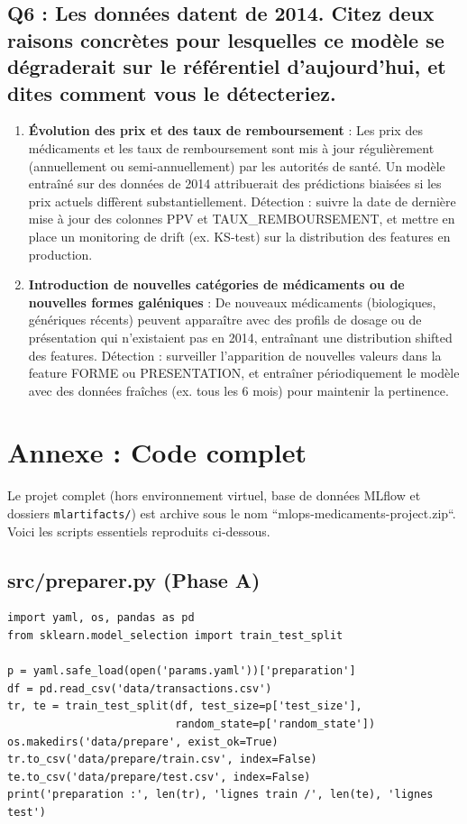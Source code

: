 \documentclass[12pt,a4paper]{report}
\begin{document}
\section{Q6 : Les données datent de 2014. Citez deux raisons concrètes pour lesquelles ce modèle se dégraderait sur le référentiel d'aujourd'hui, et dites comment vous le détecteriez.}
\begin{enumerate}
    \item \textbf{Évolution des prix et des taux de remboursement} : Les prix des médicaments et les taux de remboursement sont mis à jour régulièrement (annuellement ou semi‑annuellement) par les autorités de santé. Un modèle entraîné sur des données de 2014 attribuerait des prédictions biaisées si les prix actuels diffèrent substantiellement. Détection : suivre la date de dernière mise à jour des colonnes PPV et TAUX_REMBOURSEMENT, et mettre en place un monitoring de drift (ex. KS-test) sur la distribution des features en production.
    \item \textbf{Introduction de nouvelles catégories de médicaments ou de nouvelles formes galéniques} : De nouveaux médicaments (biologiques, génériques récents) peuvent apparaître avec des profils de dosage ou de présentation qui n'existaient pas en 2014, entraînant une distribution shifted des features. Détection : surveiller l'apparition de nouvelles valeurs dans la feature FORME ou PRESENTATION, et entraîner périodiquement le modèle avec des données fraîches (ex. tous les 6 mois) pour maintenir la pertinence.
\end{enumerate}

\chapter*{Annexe : Code complet}

Le projet complet (hors environnement virtuel, base de données MLflow et dossiers \texttt{mlartifacts/}) est archive sous le nom ``mlops-medicaments-project.zip``. Voici les scripts essentiels reproduits ci‑dessous.

\section{src/preparer.py (Phase A)}
\begin{verbatim}
import yaml, os, pandas as pd
from sklearn.model_selection import train_test_split

p = yaml.safe_load(open('params.yaml'))['preparation']
df = pd.read_csv('data/transactions.csv')
tr, te = train_test_split(df, test_size=p['test_size'],
                          random_state=p['random_state'])
os.makedirs('data/prepare', exist_ok=True)
tr.to_csv('data/prepare/train.csv', index=False)
te.to_csv('data/prepare/test.csv', index=False)
print('preparation :', len(tr), 'lignes train /', len(te), 'lignes test')
\end{verbatim}
\end{document}
